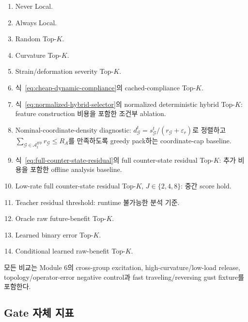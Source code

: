 \documentclass[11pt,a4paper]{article}
\newcommand{\eps}{\varepsilon}
\begin{document}
\begin{enumerate}[leftmargin=1.7em]
  \item Never Local.
  \item Always Local.
  \item Random Top-\(K\).
  \item Curvature Top-\(K\).
  \item Strain/deformation severity Top-\(K\).
  \item 식~\eqref{eq:cheap-dynamic-compliance}의 cached-compliance Top-\(K\).
  \item 식~\eqref{eq:normalized-hybrid-selector}의 normalized deterministic hybrid Top-\(K\):
  feature construction 비용을 포함한 조건부 ablation.
  \item Nominal-coordinate-density diagnostic:
  \(d_{\mathcal G}^t=s_{\mathcal G}^t/(r_{\mathcal G}+\eps_r)\)로 정렬하고
  \(\sum_{\mathcal G\in\mathcal A_t^{\mathrm{grp}}}r_{\mathcal G}\le R_A\)를 만족하도록
  greedy pack하는 coordinate-cap baseline.
  \item 식~\eqref{eq:full-counter-state-residual}의 full counter-state residual Top-\(K\):
  추가 비용을 포함한 offline analysis baseline.
  \item Low-rate full counter-state residual Top-\(K\), \(J\in\{2,4,8\}\): 중간 score hold.
  \item Teacher residual threshold: runtime 불가능한 분석 기준.
  \item Oracle raw future-benefit Top-\(K\).
  \item Learned binary error Top-\(K\).
  \item Conditional learned raw-benefit Top-\(K\).
\end{enumerate}

모든 비교는 Module 6의 cross-group excitation, high-curvature/low-load release,
topology/operator-error negative control과 fast traveling/reversing gust fixture를 포함한다.

\subsection*{Gate 자체 지표}
\end{document}
